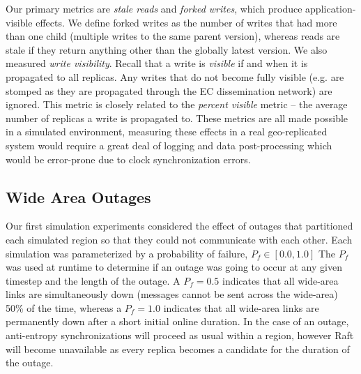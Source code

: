 Our primary metrics are \textit{stale reads} and \textit{forked writes}, which produce application-visible effects.
We define forked writes as the number of writes that had more than one child (multiple writes to the same parent version), whereas reads are stale if they return anything other than the globally latest version.
We also measured \emph{write visibility}.
Recall that a write is \emph{visible} if and when it is propagated to all replicas.
Any writes that do not become fully visible (e.g. are stomped as they are propagated through the EC dissemination network) are ignored.
This metric is closely related to the \textit{percent visible} metric -- the average number of replicas a write is propagated to.
These metrics are all made possible in a simulated environment, measuring these effects in a real geo-replicated system would require a great deal of logging and data post-processing which would be error-prone due to clock synchronization errors.

\subsection{Wide Area Outages}
\label{ch04_failure_rates}

Our first simulation experiments considered the effect of outages that partitioned each simulated region so that they could not communicate with each other.
Each simulation was parameterized by a probability of failure, $P_f \in [0.0,1.0]$
The $P_f$ was used at runtime to determine if an outage was going to occur at any given timestep and the length of the outage.
A $P_f=0.5$ indicates that all wide-area links are simultaneously down (messages cannot be sent across the wide-area) 50\% of the time, whereas a $P_f=1.0$ indicates that all wide-area links are permanently down after a short initial online duration.
In the case of an outage, anti-entropy synchronizations will proceed as usual within a region, however Raft will become unavailable as every replica becomes a candidate for the duration of the outage.

